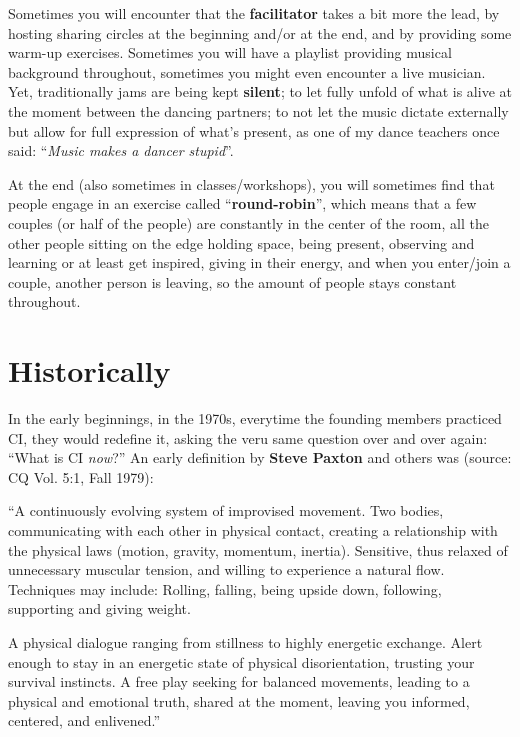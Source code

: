 Sometimes you will encounter that the \textbf{facilitator} takes a bit more the lead, by hosting sharing circles at the beginning and/or at the end, and by providing some warm-up exercises.
Sometimes you will have a playlist providing musical background throughout, sometimes you might even encounter a live musician.
Yet, traditionally jams are being kept \textbf{silent}; to let fully unfold of what is alive at the moment between the dancing partners; to not let the music dictate externally but allow for full expression of what's present, as one of my dance teachers once said: ``\textit{Music makes a dancer stupid}''.

At the end (also sometimes in classes/workshops), you will sometimes find that people engage in an exercise called ``\textbf{round-robin}'', which means that a few couples (or half of the people) are constantly in the center of the room, all the other people sitting on the edge holding space, being present, observing and learning or at least get inspired, giving in their energy, and when you enter/join a couple, another person is leaving, so the amount of people stays constant throughout.

\section{Historically}\label{sec:historically}

In the early beginnings, in the 1970s, everytime the founding members practiced CI, they would redefine it, asking the veru same question over and over again: ``What is CI \textit{now}?'' An early definition by \textbf{Steve Paxton} and others was (source: CQ Vol. 5:1, Fall 1979):

\begin{displayquote}
``A continuously evolving system of improvised movement.
Two bodies, communicating with each other in physical contact, creating a relationship with the physical laws (motion, gravity, momentum, inertia).
Sensitive, thus relaxed of unnecessary muscular tension, and willing to experience a natural flow.
Techniques may include: Rolling, falling, being upside down, following, supporting and giving weight.

A physical dialogue ranging from stillness to highly energetic exchange.
Alert enough to stay in an energetic state of physical disorientation, trusting your survival instincts.
A free play seeking for balanced movements, leading to a physical and emotional truth, shared at the moment, leaving you informed, centered, and enlivened.''
\end{displayquote}

